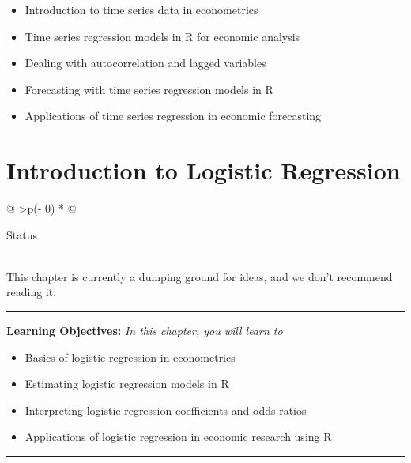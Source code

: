 \documentclass[
  letterpaper,
  twoside,
  openright,
  headsepline,
  footsepline,
  listof = totocnumbered,
  chapterprefix = true,
  titlepage = false]{scrbook}
\providecommand{\abstractname}{Learning Objectives} %
\newenvironment{objectives}[1]{%
	\hrule
	\vspace{5pt}
	\small\textbf{\abstractname: } 
	\newline
	\vspace{0.1cm}
	\small\emph{#1} %
	\itshape %
}{%
	\vspace{5pt}
	\hrule
	\vspace{0.6cm}
}
\begin{document}
\begin{itemize}
\item
  Introduction to time series data in econometrics
\item
  Time series regression models in R for economic analysis
\item
  Dealing with autocorrelation and lagged variables
\item
  Forecasting with time series regression models in R
\item
  Applications of time series regression in economic forecasting
\end{itemize}


\hypertarget{introduction-to-logistic-regression}{%
\chapter{Introduction to Logistic
Regression}\label{introduction-to-logistic-regression}}

\begin{longtable}[]{@{}
  >{\centering\arraybackslash}p{(\columnwidth - 0\tabcolsep) * }@{}}
\toprule\noalign{}
\begin{minipage}[b]{\linewidth}\centering
Status
\end{minipage} \\
\midrule\noalign{}
\endhead
\bottomrule\noalign{}
\endlastfoot
This chapter is currently a dumping ground for ideas, and we don't
recommend reading it. \\
\end{longtable}

\begin{objectives}{In this chapter, you will learn to}
\begin{itemize}

\item{Basics of logistic regression in econometrics}

\item{Estimating logistic regression models in R}

\item{Interpreting logistic regression coefficients and odds ratios}

\item{Applications of logistic regression in economic research using R}

\end{itemize}

\end{objectives}
\end{document}
